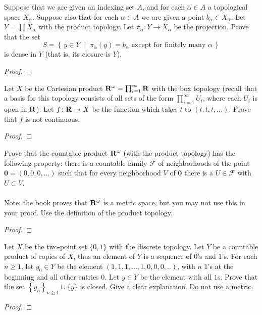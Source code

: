 \begin{problem}
Suppose that we are given an indexing set $A$, and for each
$\alpha\in A$ a topological space $X_\alpha$. Suppose also that
for each $\alpha\in A$ we are given a point $b_\alpha\in
X_\alpha$. Let $Y=\prod X_\alpha$ with the product topology. Let
$\pi_\alpha\colon Y\to X_\alpha$ be the projection. Prove that
the set
\[
S=\left\{\,y\in Y\;\middle|\;\text{$\pi_\alpha(y)=b_\alpha$ except for
    finitely many $\alpha$}\,\right\}
\]
is dense in $Y$ (that is, its closure is $Y$).
\end{problem}
\begin{proof}
\end{proof}
\begin{problem}
Let $X$ be the Cartesian product
$\mathbf{R}^\omega=\prod_{i=1}^\infty\mathbf{R}$ with the box topology (recall
that a basis for this topology consists of all sets of the form
$\prod_{i=1}^\infty U_i$, where each $U_i$ is open in $\mathbf{R}$). Let
$f\colon\mathbf{R}\to X$ be the function which takes $t$ to
$(t,t,t,...)$. Prove that $f$ is not continuous.
\end{problem}
\begin{proof}
\end{proof}
\begin{problem}
Prove that the countable product $\mathbf{R}^\omega$ (with the product
topology) has the following property: there is a countable family
$\mathcal{F}$ of neighborhoods of the point
$\mathbf{0}=(0,0,0,...)$ such that for every neighborhood $V$ of
$\mathbf{0}$ there is a $U\in\mathcal{F}$ with $U\subset V$.
\\\\
Note: the book proves that $\mathbf{R}^\omega$ is a metric space, but
you may not use this in your proof. Use the definition of the
product topology.
\end{problem}
\begin{proof}
\end{proof}
\begin{problem}
Let $X$ be the two-point set $\{0,1\}$ with the discrete
topology. Let $Y$ be a countable product of copies of $X$, thus
an element of $Y$ is a sequence of $0$'s and $1$'s. For each
$n\geq 1$, let $y_0\in Y$ be the element
$(1,1,1,...,1,0,0,0,..)$, with $n$ $1$'s at the beginning and all
other entries $0$. Let $y\in Y$ be the element with all
$1$s. Prove that the set $\left\{y_n\right\}_{n\geq 1}\cup\{y\}$
is closed. Give a clear explanation. Do not use a metric.
\end{problem}
\begin{proof}
\end{proof}

